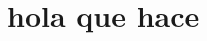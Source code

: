 \documentclass{article}
\begin{document}
\section[hola que hace]{hola que hace}
\begin{equation}
  \label{eq1}
\end{equation}






\tableofcontents{}
\end{document}
